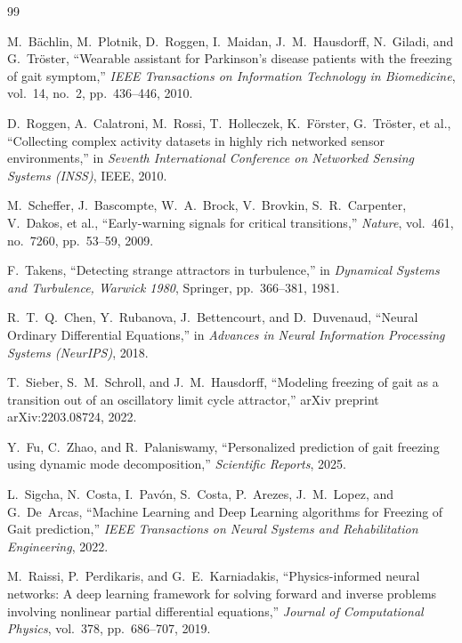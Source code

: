 \documentclass[12pt,a4paper,oneside]{report}
\numberwithin{equation}{chapter}
\numberwithin{figure}{chapter}
\numberwithin{table}{chapter}
\begin{document}
\begin{thebibliography}{99}
\small

M.~B\"{a}chlin, M.~Plotnik, D.~Roggen, I.~Maidan, J.~M.~Hausdorff, N.~Giladi, and G.~Tr\"{o}ster, ``Wearable assistant for Parkinson's disease patients with the freezing of gait symptom,'' \textit{IEEE Transactions on Information Technology in Biomedicine}, vol.~14, no.~2, pp.~436--446, 2010.

D.~Roggen, A.~Calatroni, M.~Rossi, T.~Holleczek, K.~F\"{o}rster, G.~Tr\"{o}ster, et al., ``Collecting complex activity datasets in highly rich networked sensor environments,'' in \textit{Seventh International Conference on Networked Sensing Systems (INSS)}, IEEE, 2010.

M.~Scheffer, J.~Bascompte, W.~A.~Brock, V.~Brovkin, S.~R.~Carpenter, V.~Dakos, et al., ``Early-warning signals for critical transitions,'' \textit{Nature}, vol.~461, no.~7260, pp.~53--59, 2009.

F.~Takens, ``Detecting strange attractors in turbulence,'' in \textit{Dynamical Systems and Turbulence, Warwick 1980}, Springer, pp.~366--381, 1981.

R.~T.~Q.~Chen, Y.~Rubanova, J.~Bettencourt, and D.~Duvenaud, ``Neural Ordinary Differential Equations,'' in \textit{Advances in Neural Information Processing Systems (NeurIPS)}, 2018.

T.~Sieber, S.~M.~Schroll, and J.~M.~Hausdorff, ``Modeling freezing of gait as a transition out of an oscillatory limit cycle attractor,'' arXiv preprint arXiv:2203.08724, 2022.

Y.~Fu, C.~Zhao, and R.~Palaniswamy, ``Personalized prediction of gait freezing using dynamic mode decomposition,'' \textit{Scientific Reports}, 2025.

L.~Sigcha, N.~Costa, I.~Pav\'{o}n, S.~Costa, P.~Arezes, J.~M.~Lopez, and G.~De~Arcas, ``Machine Learning and Deep Learning algorithms for Freezing of Gait prediction,'' \textit{IEEE Transactions on Neural Systems and Rehabilitation Engineering}, 2022.

M.~Raissi, P.~Perdikaris, and G.~E.~Karniadakis, ``Physics-informed neural networks: A deep learning framework for solving forward and inverse problems involving nonlinear partial differential equations,'' \textit{Journal of Computational Physics}, vol.~378, pp.~686--707, 2019.


\end{thebibliography}
\end{document}
